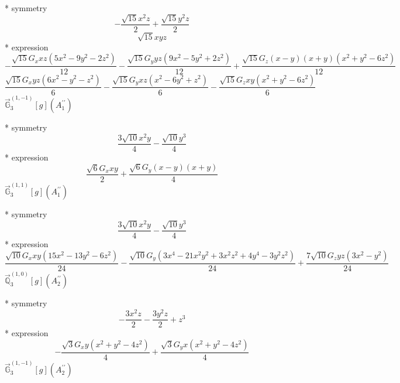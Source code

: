 \documentclass[fleqn,8pt]{jsarticle}
\begin{document}
\noindent\quad ** symmetry
\begin{dmath*}
- \frac{\sqrt{15} x^{2} z}{2} + \frac{\sqrt{15} y^{2} z}{2}
\end{dmath*}
\begin{dmath*}
\sqrt{15} x y z
\end{dmath*}
\noindent\quad ** expression
\begin{dmath*}
- \frac{\sqrt{15} G_{x} x z \left(5 x^{2} - 9 y^{2} - 2 z^{2}\right)}{12} - \frac{\sqrt{15} G_{y} y z \left(9 x^{2} - 5 y^{2} + 2 z^{2}\right)}{12} + \frac{\sqrt{15} G_{z} \left(x - y\right) \left(x + y\right) \left(x^{2} + y^{2} - 6 z^{2}\right)}{12}
\end{dmath*}
\begin{dmath*}
\frac{\sqrt{15} G_{x} y z \left(6 x^{2} - y^{2} - z^{2}\right)}{6} - \frac{\sqrt{15} G_{y} x z \left(x^{2} - 6 y^{2} + z^{2}\right)}{6} - \frac{\sqrt{15} G_{z} x y \left(x^{2} + y^{2} - 6 z^{2}\right)}{6}
\end{dmath*}
\noindent\quad $\vec{\mathbb{G}}_{3}^{(1,-1)}[g](A_{1}^{\prime\prime})$

\noindent\quad ** symmetry
\begin{dmath*}
\frac{3 \sqrt{10} x^{2} y}{4} - \frac{\sqrt{10} y^{3}}{4}
\end{dmath*}
\noindent\quad ** expression
\begin{dmath*}
\frac{\sqrt{6} G_{x} x y}{2} + \frac{\sqrt{6} G_{y} \left(x - y\right) \left(x + y\right)}{4}
\end{dmath*}
\noindent\quad $\vec{\mathbb{G}}_{3}^{(1,1)}[g](A_{1}^{\prime\prime})$

\noindent\quad ** symmetry
\begin{dmath*}
\frac{3 \sqrt{10} x^{2} y}{4} - \frac{\sqrt{10} y^{3}}{4}
\end{dmath*}
\noindent\quad ** expression
\begin{dmath*}
\frac{\sqrt{10} G_{x} x y \left(15 x^{2} - 13 y^{2} - 6 z^{2}\right)}{24} - \frac{\sqrt{10} G_{y} \left(3 x^{4} - 21 x^{2} y^{2} + 3 x^{2} z^{2} + 4 y^{4} - 3 y^{2} z^{2}\right)}{24} + \frac{7 \sqrt{10} G_{z} y z \left(3 x^{2} - y^{2}\right)}{24}
\end{dmath*}
\noindent\quad $\vec{\mathbb{Q}}_{3}^{(1,0)}[g](A_{2}^{\prime\prime})$

\noindent\quad ** symmetry
\begin{dmath*}
- \frac{3 x^{2} z}{2} - \frac{3 y^{2} z}{2} + z^{3}
\end{dmath*}
\noindent\quad ** expression
\begin{dmath*}
- \frac{\sqrt{3} G_{x} y \left(x^{2} + y^{2} - 4 z^{2}\right)}{4} + \frac{\sqrt{3} G_{y} x \left(x^{2} + y^{2} - 4 z^{2}\right)}{4}
\end{dmath*}
\noindent\quad $\vec{\mathbb{G}}_{3}^{(1,-1)}[g](A_{2}^{\prime\prime})$
\end{document}
